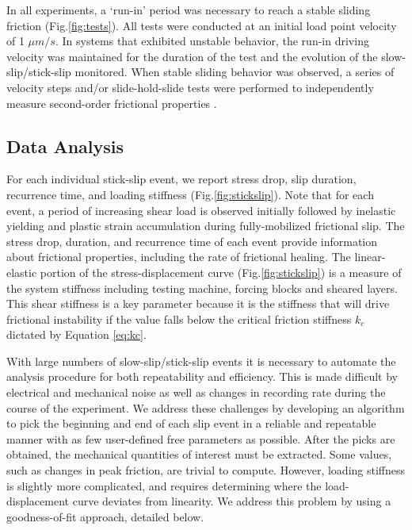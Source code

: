 In all experiments, a `run-in' period was necessary to reach a stable sliding
friction (Fig.\ref{fig:tests}).  All tests were conducted at an initial load
point velocity of 1 $\mu m/s$.  In systems that exhibited unstable behavior, the
run-in driving velocity was maintained for the duration of the test and the
evolution of the slow-slip/stick-slip monitored.  When stable sliding behavior
was observed, a series of velocity steps and/or slide-hold-slide tests were
performed to independently measure second-order frictional properties
\cite{marone1998laboratory}.

\subsection{Data Analysis}

For each individual stick-slip event, we report stress drop, slip duration,
recurrence time, and loading stiffness (Fig.\ref{fig:stickslip}). Note that for
each event, a period of increasing shear load is observed initially followed by
inelastic yielding and plastic strain accumulation during fully-mobilized
frictional slip. The stress drop, duration, and recurrence time of each event
provide information about frictional properties, including the rate of
frictional healing. The linear-elastic portion of the stress-displacement curve
(Fig.\ref{fig:stickslip}) is a measure of the system stiffness including testing
machine, forcing blocks and sheared layers. This shear stiffness is a key
parameter because it is the stiffness that will drive frictional instability if
the value falls below the critical friction stiffness $k_c$ dictated by Equation
\ref{eq:kc}.

With large numbers of slow-slip/stick-slip events it is necessary to automate
the analysis procedure for both repeatability and efficiency.  This is made
difficult by electrical and mechanical noise as well as changes in recording
rate during the course of the experiment.  We address these challenges by
developing an algorithm to pick the beginning and end of each slip event in a
reliable and repeatable manner with as few user-defined free parameters as
possible.  After the picks are obtained, the mechanical quantities of interest
must be extracted.  Some values, such as changes in peak friction, are trivial
to compute.  However, loading stiffness is slightly more complicated, and
requires determining where the load-displacement curve deviates from linearity.
We address this problem by using a goodness-of-fit approach, detailed below.

